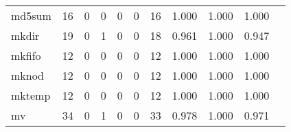 \begin{longtable}{lp{1.20cm}p{1.20cm}p{1.20cm}p{1.20cm}p{1.20cm}p{1.20cm}p{1.20cm}p{1.20cm}p{1.20cm}p{1.20cm}}
md5sum    &                                    16 &                                                  0 &                                                  0 &                                                  0 &                                                  0 &                                                 16 &                                         1.000 &                                              1.000 &                                              1.000 \\
mkdir     &                                    19 &                                                  0 &                                                  1 &                                                  0 &                                                  0 &                                                 18 &                                         0.961 &                                              1.000 &                                              0.947 \\
mkfifo    &                                    12 &                                                  0 &                                                  0 &                                                  0 &                                                  0 &                                                 12 &                                         1.000 &                                              1.000 &                                              1.000 \\
mknod     &                                    12 &                                                  0 &                                                  0 &                                                  0 &                                                  0 &                                                 12 &                                         1.000 &                                              1.000 &                                              1.000 \\
mktemp    &                                    12 &                                                  0 &                                                  0 &                                                  0 &                                                  0 &                                                 12 &                                         1.000 &                                              1.000 &                                              1.000 \\
mv        &                                    34 &                                                  0 &                                                  1 &                                                  0 &                                                  0 &                                                 33 &                                         0.978 &                                              1.000 &                                              0.971 \\

\end{longtable}
